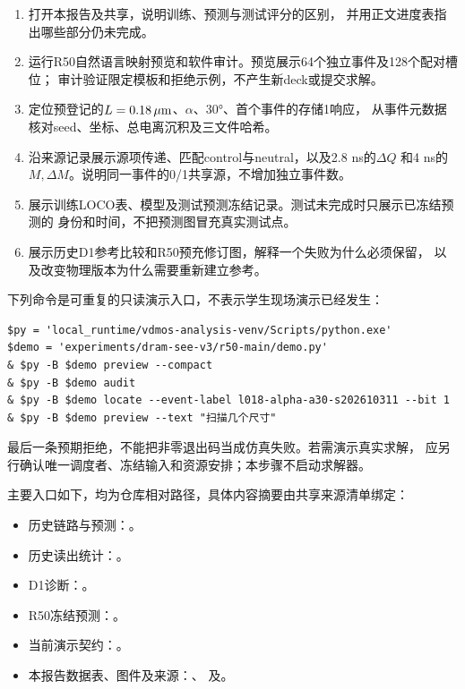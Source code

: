 \begin{enumerate}
\setlength{\itemsep}{0.15em}
\item 打开本报告及共享，说明训练、预测与测试评分的区别，
并用正文进度表指出哪些部分仍未完成。
\item 运行R50自然语言映射预览和软件审计。预览展示64个独立事件及128个配对槽位；
审计验证限定模板和拒绝示例，不产生新deck或提交求解。
\item 定位预登记的$L=0.18\,\mu\mathrm{m}$、$\alpha$、30°、首个事件的存储1响应，
从事件元数据核对seed、坐标、总电离沉积及三文件哈希。
\item 沿来源记录展示源项传递、匹配control与neutral，以及2.8 ns的$\Delta Q$
和4 ns的$M,\Delta M$。说明同一事件的0/1共享源，不增加独立事件数。
\item 展示训练LOCO表、模型及测试预测冻结记录。测试未完成时只展示已冻结预测的
身份和时间，不把预测图冒充真实测试点。
\item 展示历史D1参考比较和R50预充修订图，解释一个失败为什么必须保留，
以及改变物理版本为什么需要重新建立参考。
\end{enumerate}

\noindent 下列命令是可重复的只读演示入口，不表示学生现场演示已经发生：
{\small\begin{verbatim}
$py = 'local_runtime/vdmos-analysis-venv/Scripts/python.exe'
$demo = 'experiments/dram-see-v3/r50-main/demo.py'
& $py -B $demo preview --compact
& $py -B $demo audit
& $py -B $demo locate --event-label l018-alpha-a30-s202610311 --bit 1
& $py -B $demo preview --text "扫描几个尺寸"
\end{verbatim}}
最后一条预期拒绝，不能把非零退出码当成仿真失败。若需演示真实求解，
应另行确认唯一调度者、冻结输入和资源安排；本步骤不启动求解器。

\noindent 主要入口如下，均为仓库相对路径，具体内容摘要由共享来源清单绑定：
\begin{itemize}
\item 历史链路与预测：。
\item 历史读出统计：。
\item D1诊断：。
\item R50冻结预测：。
\item 当前演示契约：。
\item 本报告数据表、图件及来源：、
及。
\end{itemize}

